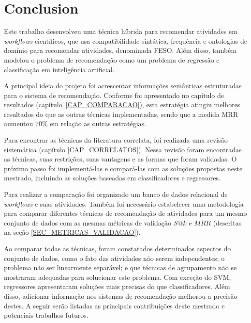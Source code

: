 \documentclass[10pt]{article}
\begin{document}
\section*{Conclusion}\label{sec:conclusion}

Este trabalho desenvolveu uma técnica híbrida para recomendar atividades em \emph{workflows} científicos, que usa compatibilidade sintática, frequência e ontologias de domínio para recomendar atividades, denominada FESO. Além disso, também modelou o problema de recomendação como um problema de regressão e classificação em inteligência artificial.

A principal ideia do projeto foi acrescentar informações semânticas estruturadas para o sistema de recomendação. Conforme foi apresentado no capítulo de resultados (capítulo~\ref{CAP_COMPARACAO}), esta estratégia atingiu melhores resultados do que as outras técnicas implementadas, sendo que a medida MRR aumentou \(70\%\) em relação as outras estratégias.

Para encontrar as técnicas da literatura correlata, foi realizada uma revisão sistemática (capítulo \ref{CAP_CORRELATOS}). Nessa revisão foram encontradas as técnicas, suas restrições, suas vantagens e as formas que foram validadas. O próximo passo foi implementá-las e compará-las com as soluções propostas neste mestrado, incluindo as soluções baseadas em classificadores e regressores. 

Para realizar a comparação foi organizado um banco de dados relacional de \emph{workflows} e suas atividades. Também foi necessário estabelecer uma metodologia para comparar diferentes técnicas de recomendação de atividades para um mesmo conjunto de dados com as mesmas métricas de validação \(S@k\) e \(MRR\) (descritas na seção \ref{SEC_METRICAS_VALIDACAO}). 

Ao comparar todas as técnicas, foram constatados determinados aspectos do conjunto de dados, como o fato das atividades não serem independentes; o problema não ser linearmente separável; e que técnicas de agrupamento não se mostraram adequadas para solucionar este problema. Com exceção do SVM, regressores apresentaram soluções mais precisas do que classificadores. Além disso, adicionar informação nos sistemas de recomendação melhorou a precisão destes. A seguir serão listadas as principais contribuições deste mestrado e potenciais trabalhos futuros.


\end{document}
